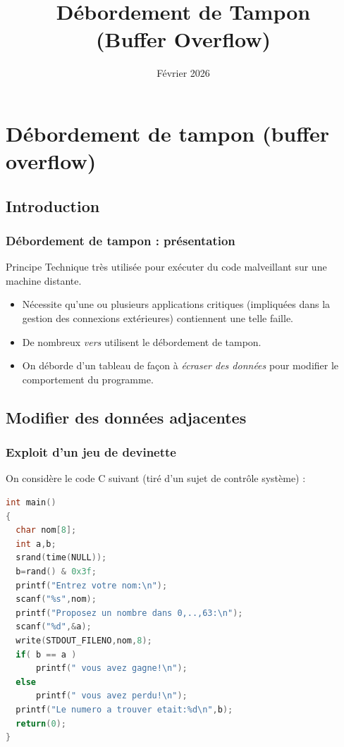 \documentclass{beamer}
\title{Débordement de Tampon \\ {\small (Buffer Overflow)}}
\date{Février 2026}
\newcommand{\enlight}[1]{\textit{\color{blue}#1}}
\begin{document}
\maketitle



\section{Débordement de tampon (buffer overflow)}

\subsection{Introduction}

\begin{frame}
\frametitle{Débordement de tampon : présentation}

\begin{block}{Principe}
Technique très utilisée pour exécuter du code malveillant sur une machine distante.
\end{block}

\begin{itemize}
\item Nécessite qu'une ou plusieurs applications critiques (impliquées dans la gestion des connexions extérieures) contiennent une telle faille.
\item De nombreux \enlight{vers} utilisent le débordement de tampon.
\item On déborde d'un tableau de façon à \enlight{écraser des données} pour modifier le comportement du programme.
\end{itemize}

\end{frame}


\subsection{Modifier des données adjacentes}

\begin{frame}[fragile]
\frametitle{Exploit d'un jeu de devinette}

On considère le code C suivant (tiré d'un sujet de contrôle système) :

\begin{lstlisting}[language=C]
int main()
{
  char nom[8];
  int a,b;
  srand(time(NULL));
  b=rand() & 0x3f;
  printf("Entrez votre nom:\n");
  scanf("%s",nom);
  printf("Proposez un nombre dans 0,..,63:\n");
  scanf("%d",&a);
  write(STDOUT_FILENO,nom,8);
  if( b == a )
      printf(" vous avez gagne!\n");
  else
      printf(" vous avez perdu!\n");
  printf("Le numero a trouver etait:%d\n",b);
  return(0);
}
\end{lstlisting}

\end{frame}
\end{document}
